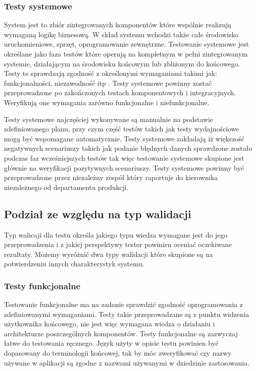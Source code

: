 \subsubsection{Testy systemowe}
System jest to zbiór zintegrowanych komponentów które wspólnie realizują wymaganą logikę biznesową. W skład systemu wchodzi także całe środowisko uruchomieniowe, sprzęt, oprogramowanie zewnętrzne. Testowanie systemowe jest określane jako faza testów które operują na kompletnym w pełni zintegrowanym systemie, działającym na środowisku końcowym lub zbliżonym do końcowego. Testy te sprawdzają zgodność z określonymi wymaganiami takimi jak: funkcjonalności, niezawodność itp
.
Testy systemowe powinny zostać przeprowadzone po  zakończonych testach  komponentowych i integracyjnych.  Weryfikują one wymagania zarówno funkcjonalne i niefunkcjonalne.

Testy systemowe najczęściej wykonywane są manualnie na podstawie zdefiniowanego planu, przy czym część testów takich jak testy wydajnościowe mogą być wspomagane automatycznie.
Testy systemowe zakładają iż większość negatywnych scenariuszy takich jak podanie błędnych danych sprawdzone zostało podczas faz wcześniejszych testów tak więc testowanie systemowe skupione jest głównie na weryfikacji pozytywnych scenariuszy. 
Testy systemowe powinny być przeprowadzone przez niezależny zespół który raportuje do kierownika niezależnego od departamentu produkcji. 



\subsection{Podział ze względu na typ walidacji}
Typ walicaji dla testu określa jakiego typu wiedza wymagane jest do jego przeprowadzenia i z jakiej perspektywy tester powinien oceniać oczekiwane rezultaty. Możemy wyróżnić dwa typy walidacji które skupione są na potwierdzeniu innych charakterystyk systemu.
\subsubsection{Testy funkcjonalne}
Testowanie funkcjonalne ma na zadanie sprawdzić zgodność oprogramowania z zdefiniowanymi wymaganiami. Testy takie przeprowadzane są z punktu widzenia użytkownika końcowego, nie jest więc wymagana wiedza o działaniu i architekturze poszczególnych komponentów. Testy funkcjonalne są  zazwyczaj łatwe do testowania ręcznego. Język użyty w opisie testu powinien być dopasowany do terminologii końcowej, tak by móc zweryfikować czy nazwy używane w aplikacji są zgodne z nazwami używanymi w dziedzinie zastosowania.

